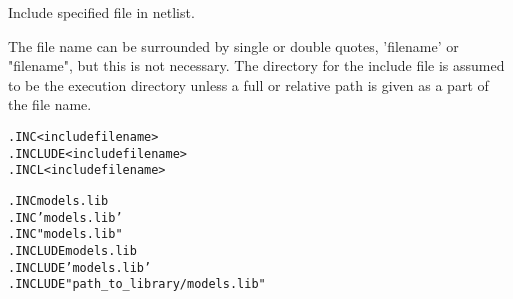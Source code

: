 


Include specified file in netlist.

The file name can be surrounded by single or double quotes, 'filename'
or "filename", but this is not necessary.  The directory for the
include file is assumed to be the execution directory unless a full or
relative path is given as a part of the file name.

\begin{Command}
\format
\begin{alltt}
.INC <include file name>
.INCLUDE <include file name>
.INCL <include file name>
\end{alltt}

\examples
\begin{alltt}
.INC models.lib
.INC 'models.lib'
.INC "models.lib"
.INCLUDE models.lib
.INCLUDE 'models.lib'
.INCLUDE "path\_to\_library/models.lib"
\end{alltt}

\end{Command}

